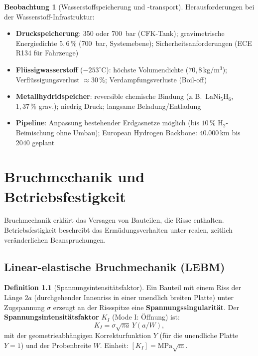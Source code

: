 ﻿\documentclass[a4paper,12pt]{report}
\theoremstyle{definition}
\newtheorem{definition}{Definition}
\newtheorem{beobachtung}{Beobachtung}
\begin{document}
\begin{beobachtung}[Wasserstoffspeicherung und -transport]
Herausforderungen bei der Wasserstoff-Infrastruktur:
\begin{itemize}
    \item[-] \textbf{Druckspeicherung}: 350 oder 700~bar (CFK-Tank); gravimetrische
          Energiedichte $5{,}6\,\%$ (700~bar, Systemebene); Sicherheitsanforderungen
          (ECE R134 für Fahrzeuge)
    \item[-] \textbf{Flüssigwasserstoff} ($-253^\circ\mathrm{C}$): höchste Volumendichte
          ($70{,}8\,\mathrm{kg/m^3}$); Verflüssigungsverlust $\approx 30\,\%$;
          Verdampfungsverluste (Boil-off)
    \item[-] \textbf{Metallhydridspeicher}: reversible chemische Bindung
          (z.\,B.\ LaNi$_5$H$_6$, $1{,}37\,\%$ grav.); niedrig Druck; langsame
          Beladung/Entladung
    \item[-] \textbf{Pipeline}: Anpassung bestehender Erdgasnetze möglich
          (bis $10\,\%$ H$_2$-Beimischung ohne Umbau);
          European Hydrogen Backbone: $40.000\,\mathrm{km}$ bis 2040 geplant
\end{itemize}
\end{beobachtung}

\chapter{Bruchmechanik und Betriebsfestigkeit}

Bruchmechanik erklärt das Versagen von Bauteilen, die Risse enthalten.
Betriebsfestigkeit beschreibt das Ermüdungsverhalten unter realen,
zeitlich veränderlichen Beanspruchungen.

\section{Linear-elastische Bruchmechanik (LEBM)}

\begin{definition}[Spannungsintensitätsfaktor]
Ein Bauteil mit einem Riss der Länge $2a$ (durchgehender Innenriss
in einer unendlich breiten Platte) unter Zugspannung $\sigma$ erzeugt
an der Rissspitze eine \textbf{Spannungssingularität}.
Der \textbf{Spannungsintensitätsfaktor} $K_I$ (Mode I: Öffnung) ist:
\[
  K_I = \sigma\sqrt{\pi a}\,Y(a/W),
\]
mit der geometrieabhängigen Korrekturfunktion $Y$ (für die unendliche
Platte $Y = 1$) und der Probenbreite $W$.
Einheit: $[K_I] = \mathrm{MPa\sqrt{m}}$.
\end{definition}
\end{document}
